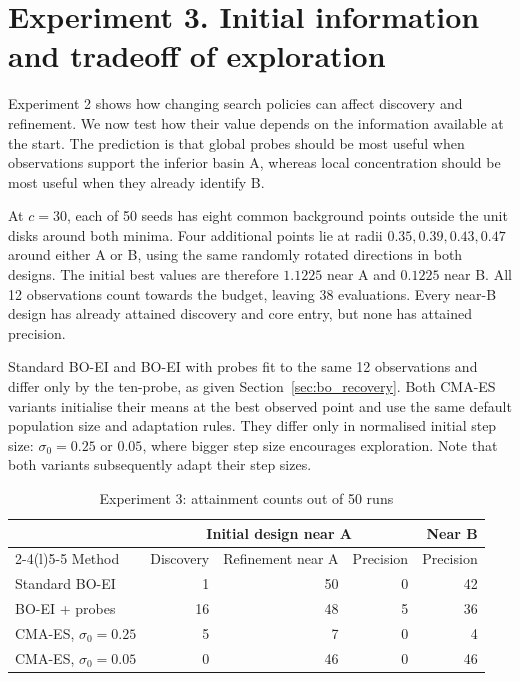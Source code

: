 \section{Experiment 3. Initial information and tradeoff of exploration}\label{sec:controlled}
Experiment 2 shows how changing search policies can affect discovery and refinement. We now test how their value depends on the information available at the start. The prediction is that global probes should be most useful when observations support the inferior basin A, whereas local concentration should be most useful when they already identify B.

At \(c=30\), each of 50 seeds has eight common background points outside the unit disks around both minima. Four additional points lie at radii \(0.35,0.39,0.43,0.47\) around either A or B, using the same randomly rotated directions in both designs. The initial best values are therefore \(1.1225\) near A and \(0.1225\) near B. All 12 observations count towards the budget, leaving 38 evaluations. Every near-B design has already attained discovery and core entry, but none has attained precision.

Standard BO-EI and BO-EI with probes fit to the same 12 observations and differ only by the ten-probe, as given Section~\ref{sec:bo_recovery}. Both CMA-ES variants initialise their means at the best observed point and use the same default population size and adaptation rules. They differ only in normalised initial step size: \(\sigma_0=0.25\) or \(0.05\), where bigger step size encourages exploration. Note that both variants subsequently adapt their step sizes. 

\begin{table}[!htb]
 \centering
 \caption{Experiment 3: attainment counts out of 50 runs}
 \label{tab:controlled}
 \begin{tabular}{lrrrr}
 \toprule
 & \multicolumn{3}{c}{Initial design near A} & Near B\\
 \cmidrule(lr){2-4}\cmidrule(l){5-5}
 Method & Discovery & Refinement near A & Precision & Precision\\
 \midrule
 Standard BO-EI            & 1  & 50 & 0 & 42\\
 BO-EI + probes            & 16 & 48 & 5 & 36\\
 CMA-ES, \(\sigma_0=0.25\) & 5 & 7 & 0 & 4\\
 CMA-ES, \(\sigma_0=0.05\) & 0 & 46 & 0 & 46\\
 \bottomrule
 \end{tabular}
\end{table}


